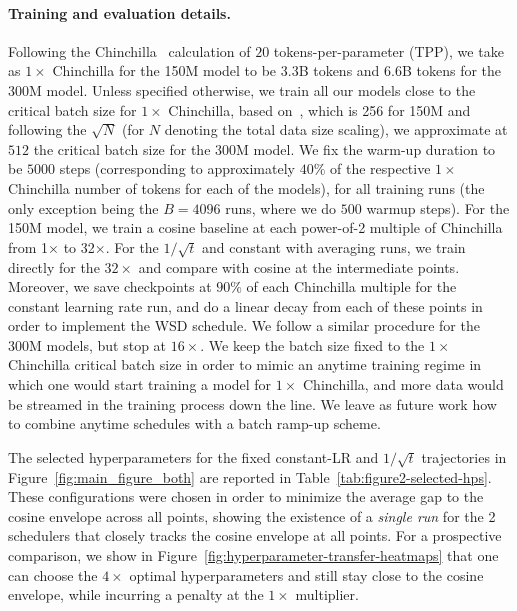 \documentclass{article}
\theoremstyle{plain}
\begin{document}
\paragraph{Training and evaluation details.}
Following the Chinchilla~\citep{hoffmann2022training} calculation of $20$ tokens-per-parameter (TPP), we take as $1\times$ Chinchilla for the 150M model to be 3.3B tokens and 6.6B tokens for the 300M model. Unless specified otherwise, we train all our models close to the critical batch size for $1 \times$ Chinchilla, based on~\citet{zhang2024does}, which is 256 for 150M and following the $\sqrt{N}$ (for $N$ denoting the total data size scaling), we approximate at $512$ the critical batch size for the 300M model. We fix the warm-up duration to be $5000$ steps (corresponding to approximately $40\%$ of the respective $1\times$ Chinchilla number of tokens for each of the models), for all training runs (the only exception being the $B=4096$ runs, where we do $500$ warmup steps). For the 150M model, we train a cosine baseline at each power-of-2 multiple of Chinchilla from 1$\times$ to 32$\times$. For the $1/\sqrt{t}$ and constant with averaging runs, we train directly for the $32\times$ and compare with cosine at the intermediate points. Moreover, we save checkpoints at $90\%$ of each Chinchilla multiple for the constant learning rate run, and do a linear decay from each of these points in order to implement the WSD schedule. We follow a similar procedure for the 300M models, but stop at $16\times$. We keep the batch size fixed to the $1\times$ Chinchilla critical batch size in order to mimic an anytime training regime in which one would start training a model for $1 \times$ Chinchilla, and more data would be streamed in the training process down the line. We leave as future work how to combine anytime schedules with a batch ramp-up scheme.

The selected hyperparameters for the fixed constant-LR and $1/\sqrt{t}$ trajectories in Figure~\ref{fig:main_figure_both} are reported in Table~\ref{tab:figure2-selected-hps}. These configurations were chosen in order to minimize the average gap to the cosine envelope across all points, showing the existence of a \textit{single run} for the 2 schedulers that closely tracks the cosine envelope at all points. For a prospective comparison, we show in Figure~\ref{fig:hyperparameter-transfer-heatmaps} that one can choose the $4 \times$ optimal hyperparameters and still stay close to the cosine envelope, while incurring a penalty at the $1 \times$ multiplier.
\end{document}
